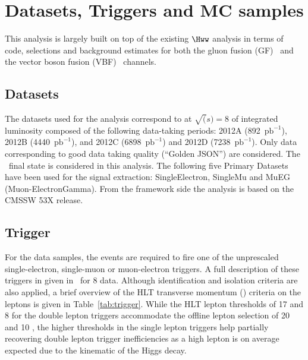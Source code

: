\section{Datasets, Triggers and MC samples}
\label{sec:Datasets}

This analysis is largely built on top of the existing $\Hww$ analysis in terms of code, selections and background estimates for both the gluon fusion (GF)~\cite{AN-2013-022} and the vector boson fusion (VBF)~\cite{AN-13-097} channels.

\subsection{Datasets\label{subsec:Datasets}}

The datasets used for the analysis correspond to \usedLumiEight at $\sqrt(s)=8$ \TeV  of integrated luminosity composed of the following 
data-taking periods: 2012A (892~$\mathrm{pb}^{-1}$), 2012B (4440~$\mathrm{pb}^{-1}$), and 2012C (6898~$\mathrm{pb}^{-1}$) and 2012D (7238~$\mathrm{pb}^{-1}$).
Only data corresponding to good data taking quality (``Golden JSON'') are considered.
The \elPM\muMP~final state is considered in this analysis.
The following five Primary Datasets have been used for
the signal extraction: SingleElectron, SingleMu and MuEG (Muon-ElectronGamma). From the framework side the analysis is based on the CMSSW 53X release.

\subsection{Trigger\label{subsec:Trigger}}

For the data samples, the events are required to fire one of the unprescaled
single-electron, single-muon or muon-electron triggers.
A full description of these triggers in given in~\cite{AN-2012-228} for 8 \TeV data. Although identification and isolation criteria are
also applied, a brief overview of the HLT transverse momentum (\pt) criteria on the leptons
is given in Table~\ref{tab:trigger}. While the HLT lepton \pt thresholds of 17 and 8 \GeV for the double
lepton triggers accommodate the offline lepton \pt selection of 20 and 10 \GeV, the higher \pt thresholds
in the single lepton triggers help partially recovering double lepton trigger inefficiencies
as a high \pt lepton is on average expected due to the kinematic of the Higgs decay. 

